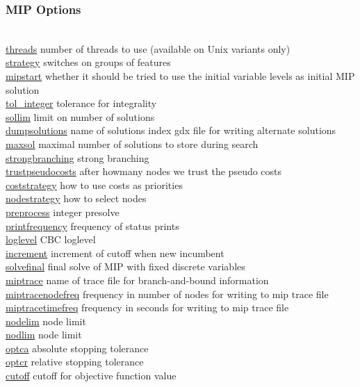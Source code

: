 \subsubsection{MIP Options}
\begin{tabbing}
\hspace {1.3in} \= \\
\hyperlink{threads}
{threads} \> number of threads to use (available on Unix variants only) \\
\hyperlink{strategy}
{strategy} \> switches on groups of features \\
\hyperlink{mipstart}
{mipstart} \> whether it should be tried to use the initial variable levels as initial MIP solution \\
\hyperlink{tol_integer}
{tol\_integer} \> tolerance for integrality \\
\hyperlink{sollim}
{sollim} \> limit on number of solutions \\
\hyperlink{dumpsolutions}
{dumpsolutions} \> name of solutions index gdx file for writing alternate solutions \\
\hyperlink{maxsol}
{maxsol} \> maximal number of solutions to store during search \\
\hyperlink{strongbranching}
{strongbranching} \> strong branching \\
\hyperlink{trustpseudocosts}
{trustpseudocosts} \> after howmany nodes we trust the pseudo costs \\
\hyperlink{coststrategy}
{coststrategy} \> how to use costs as priorities \\
\hyperlink{nodestrategy}
{nodestrategy} \> how to select nodes \\
\hyperlink{preprocess}
{preprocess} \> integer presolve \\
\hyperlink{printfrequency}
{printfrequency} \> frequency of status prints \\
\hyperlink{loglevel}
{loglevel} \> CBC loglevel \\
\hyperlink{increment}
{increment} \> increment of cutoff when new incumbent \\
\hyperlink{solvefinal}
{solvefinal} \> final solve of MIP with fixed discrete variables \\
\hyperlink{miptrace}
{miptrace} \> name of trace file for branch-and-bound information \\
\hyperlink{miptracenodefreq}
{miptracenodefreq} \> frequency in number of nodes for writing to mip trace file \\
\hyperlink{miptracetimefreq}
{miptracetimefreq} \> frequency in seconds for writing to mip trace file \\
\hyperlink{nodelim}
{nodelim} \> node limit \\
\hyperlink{nodlim}
{nodlim} \> node limit \\
\hyperlink{optca}
{optca} \> absolute stopping tolerance \\
\hyperlink{optcr}
{optcr} \> relative stopping tolerance \\
\hyperlink{cutoff}
{cutoff} \> cutoff for objective function value
\end{tabbing}


